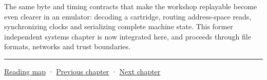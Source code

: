 The same byte and timing contracts that make the workshop replayable become even clearer in an emulator: decoding a cartridge, routing address-space reads, synchronizing clocks and serializing complete machine state. This former independent systems chapter is now integrated here, and proceeds through file formats, networks and trust boundaries.

\begin{center}\rule{0.5\linewidth}{0.5pt}\end{center}

\hyperref[volume-reading-map]{Reading map} · \hyperref[06-engine-ii-ch040-coupled-contacts-and-iterative-response]{Previous chapter} · \hyperref[06-engine-ii-ch042-from-cartridge-bytes-to-a-reproducible-machine]{Next chapter}
